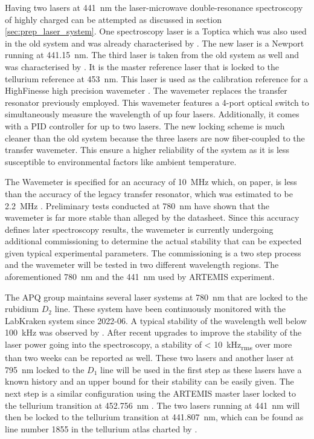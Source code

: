 Having two lasers at \qty{441}{\nm} the laser-microwave double-resonance spectroscopy of highly charged  can be attempted as discussed in section \ref{sec:prep_laser_system}. One spectroscopy laser is a Toptica  which was also used in the old system and was already characterised by \citeauthor{thesis_alex} \cite{thesis_alex}. The new laser is a Newport  running at \qty{441.15}{\nm}. The third laser is taken from the old system as well and was characterised by \citeauthor{thesis_baus} \cite{thesis_baus}. It is the master reference laser that is locked to the tellurium reference at \qty{453}{\nm}. This laser is used as the calibration reference for a HighFinesse  high precision wavemeter \cite{datasheet_ws8}. The wavemeter replaces the transfer resonator previously employed. This wavemeter features a 4-port optical switch to simultaneously measure the wavelength of up four lasers. Additionally, it comes with a PID controller for up to two lasers. The new locking scheme is much cleaner than the old system because the three lasers are now fiber-coupled to the transfer wavemeter. This ensure a higher reliability of the system as it is less susceptible to environmental factors like ambient temperature.

The Wavemeter is specified for an accuracy of \qty{10}{\MHz} which, on paper, is less than the accuracy of the legacy transfer resonator, which was estimated to be \qty{2.2}{\MHz} \cite{thesis_alex}. Preliminary tests conducted at \qty{780}{\nm} have shown that the wavemeter is far more stable than alleged by the datasheet. Since this accuracy defines later spectroscopy results, the wavemeter is currently undergoing additional commissioning to determine the actual stability that can be expected given typical experimental parameters. The commissioning is a two step process and the wavemeter will be tested in two different wavelength regions. The aforementioned \qty{780}{\nm} and the \qty{441}{\nm} used by ARTEMIS experiment.

The APQ group maintains several laser systems at \qty{780}{\nm} that are locked to the rubidium  $D_2$ line. These system have been continuously monitored with the LabKraken system since 2022-06. A typical stability of the wavelength well below \qty{100}{\kHz} was observed by \citeauthor{thesis_tilman} \cite{thesis_tilman}. After recent upgrades to improve the stability of the laser power going into the spectroscopy, a stability of \qty{< 10}{\kHz_{rms}} over more than two weeks can be reported as well. These two lasers and another laser at \qty{795}{\nm} locked to the  $D_1$ line will be used in the first step as these lasers have a known history and an upper bound for their stability can be easily given. The next step is a similar configuration using the ARTEMIS master laser locked to the tellurium transition at \qty{452.756}{\nm} \cite{te_reference_lines}. The two lasers running at \qty{441}{\nm} will then be locked to the tellurium transition at \qty{441.807}{\nm}, which can be found as line number \num{1855} in the tellurium atlas charted by \citeauthor{te_reference_lines} \cite{te_reference_lines}.

